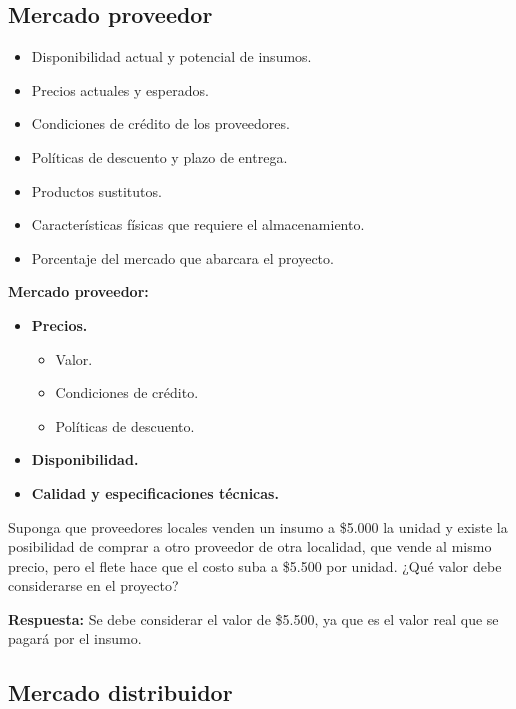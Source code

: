 \documentclass{templateNote}
\begin{document}
\subsection{Mercado proveedor}
\begin{itemize}
    \item Disponibilidad actual y potencial de insumos.
    \item Precios actuales y esperados.
    \item Condiciones de crédito de los proveedores.
    \item Políticas de descuento y plazo de entrega.
    \item Productos sustitutos.
    \item Características físicas que requiere el almacenamiento.
    \item Porcentaje del mercado que abarcara el proyecto.
\end{itemize}

\textbf{Mercado proveedor:}
\begin{itemize}
    \item \textbf{Precios.}
    \begin{itemize}
        \item Valor.
        \item Condiciones de crédito.
        \item Políticas de descuento.
    \end{itemize}
    \item \textbf{Disponibilidad.}
    \item \textbf{Calidad y especificaciones técnicas.}
\end{itemize}

\begin{tcolorbox}[colback=red!5!white,colframe=green!75!black]
    Suponga que proveedores locales venden un insumo a \$5.000 la unidad y existe la posibilidad de comprar a otro proveedor de otra localidad, que vende al mismo precio, pero el flete hace que el costo suba a \$5.500 por unidad. ¿Qué valor debe considerarse en el proyecto?

    \textbf{Respuesta:} Se debe considerar el valor de \$5.500, ya que es el valor real que se pagará por el insumo.
\end{tcolorbox}

\subsection{Mercado distribuidor}
\end{document}
